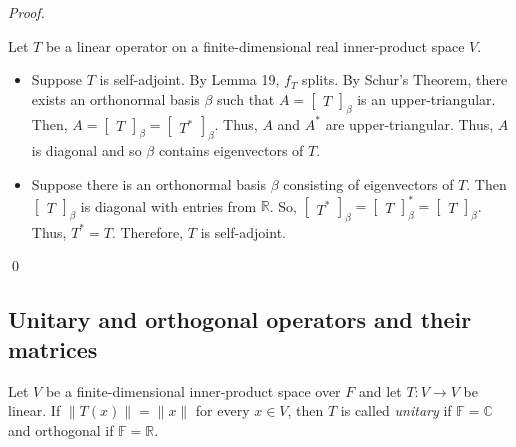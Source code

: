 \documentclass[12pt]{article}
\newenvironment{definition}[2][Definition]{\begin{trivlist}
\item[\hskip \labelsep {\bfseries #1}\hskip \labelsep {\bfseries #2}]}{\end{trivlist}}
\newenvironment{sol}
    {\emph{Proof.}
    }
    {
    \qed
    }
\begin{document}
\vspace{1em}

\begin{sol}
Let $T$ be a linear operator on a finite-dimensional real inner-product space $V$.
\begin{itemize}
    \item[$\Longrightarrow$] Suppose $T$ is self-adjoint. By Lemma 19, $f_T$ splits. By Schur's Theorem, there exists an orthonormal basis $\beta$ such that $A = \begin{bmatrix}
    T
    \end{bmatrix}_\beta$ is an upper-triangular. Then, $A = \begin{bmatrix}
    T
    \end{bmatrix}_\beta = \begin{bmatrix}
    T^*
    \end{bmatrix}_\beta$. Thus, $A$ and $A^*$ are upper-triangular. Thus, $A$ is diagonal and so $\beta$ contains eigenvectors of $T$.
    
    \item[$\Longleftarrow$] Suppose there is an orthonormal basis $\beta$ consisting of eigenvectors of $T$. Then $\begin{bmatrix}
    T
    \end{bmatrix}_\beta$ is diagonal with entries from $\mathbb{R}$. So, $\begin{bmatrix}
    T^*
    \end{bmatrix}_\beta = \begin{bmatrix}
    T
    \end{bmatrix}_\beta^* = \begin{bmatrix}
    T
    \end{bmatrix}_\beta$. Thus, $T^* = T$. Therefore, $T$ is self-adjoint.
\end{itemize}
\end{sol}

\subsection{Unitary and orthogonal operators and their matrices}

\begin{definition}{9}
Let $V$ be a finite-dimensional inner-product space over $F$ and let $T : V \to V$ be linear. If $\lVert T(x) \rVert = \lVert x \rVert$ for every $x \in V$, then $T$ is called \textit{unitary} if $\mathbb{F} = \mathbb{C}$ and orthogonal if $\mathbb{F} = \mathbb{R}$. 
\end{definition}
\end{document}
